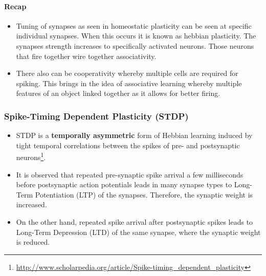 \documentclass[main]{subfiles}
\begin{document}
\noindent

\paragraph{Recap}
\begin{itemize}
    \item Tuning of synapses as seen in homeostatic plasticity can be seen at specific individual synapses. When this occurs it is known as hebbian plasticity. The synapses strength increases to specifically activated neurons. Those neurons that fire together wire together associativity.  
    \item There also can be cooperativity whereby multiple cells are required for spiking. This brings in the idea of associative learning whereby multiple features of an object linked together as it allows for better firing. 
\end{itemize}

\subsubsection{Spike-Timing Dependent Plasticity (STDP)}
\begin{itemize}
    \item STDP is a \textbf{temporally asymmetric} form of Hebbian learning induced by tight temporal correlations between the spikes of pre- and postsynaptic neurons\footnote{\url{http://www.scholarpedia.org/article/Spike-timing_dependent_plasticity}}.
    \item It is observed that repeated pre-synaptic spike arrival a few milliseconds before postsynaptic action potentials leads in many synapse types to Long-Term Potentiation (LTP) of the synapses. Therefore, the synaptic weight is increased.
    \item On the other hand, repeated spike arrival after postsynaptic spikes leads to Long-Term Depression (LTD) of the same synapse, where the synaptic weight is reduced.
\end{itemize}
\end{document}
